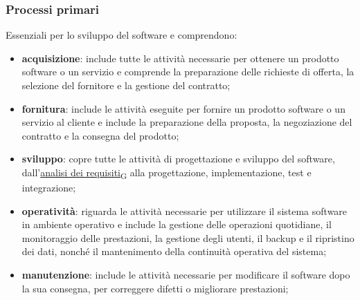 \subsubsection{Processi primari}
Essenziali per lo sviluppo del software e comprendono:
\begin{itemize}
    \item \textbf{acquisizione}: include tutte le attività necessarie per ottenere un prodotto software o un servizio e comprende la preparazione delle richieste di offerta, la selezione del fornitore e la gestione del contratto;
    \item \textbf{fornitura}: include le attività eseguite per fornire un prodotto software o un servizio al cliente e include la preparazione della proposta, la negoziazione del contratto e la consegna del prodotto;
    \item \textbf{sviluppo}: copre tutte le attività di progettazione e sviluppo del software, dall'\href{https://7last.github.io/docs/rtb/documentazione-interna/glossario\#analisi-dei-requisiti}{analisi dei requisiti\textsubscript{G}} alla progettazione, implementazione, test e integrazione;
    \item \textbf{operatività}: riguarda le attività necessarie per utilizzare il sistema software in ambiente operativo e include la gestione delle operazioni quotidiane, il monitoraggio delle prestazioni, la gestione degli utenti, il backup e il ripristino dei dati, nonché il mantenimento della continuità operativa del sistema;
    \item \textbf{manutenzione}: include le attività necessarie per modificare il software dopo la sua consegna, per correggere difetti o migliorare prestazioni;
\end{itemize}
